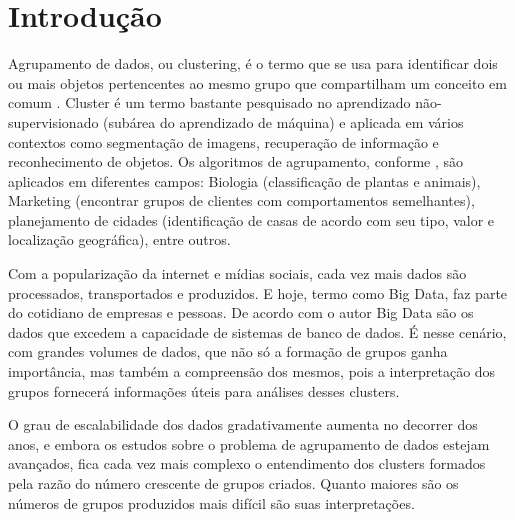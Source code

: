 

\chapter{Introdução} \label{cap:introd}

Agrupamento de dados, ou clustering, é o termo que se usa para identificar dois ou mais objetos pertencentes ao mesmo grupo que compartilham um conceito em comum \cite{Kumar2013}. Cluster é um termo bastante pesquisado no aprendizado não-supervisionado (subárea do aprendizado de máquina) e  aplicada em vários contextos como segmentação de imagens, recuperação de informação e reconhecimento de objetos. Os algoritmos de agrupamento, conforme , são aplicados em diferentes campos: Biologia (classificação de plantas e animais), Marketing (encontrar grupos de clientes com comportamentos semelhantes), planejamento de cidades (identificação de casas de acordo com seu tipo, valor e localização geográfica), entre outros.

Com a popularização da internet e mídias sociais, cada vez mais dados são processados, transportados e produzidos. E hoje, termo como Big Data, faz parte do cotidiano de empresas e pessoas. De acordo com o autor  Big Data são os dados que excedem a capacidade de sistemas de banco de dados. É nesse cenário, com grandes volumes de dados, que não só a formação de grupos ganha importância, mas também a compreensão dos mesmos, pois a interpretação dos grupos fornecerá informações úteis para análises desses clusters.


O grau de escalabilidade dos dados gradativamente aumenta no decorrer dos anos, e embora os estudos sobre o problema de agrupamento de dados estejam avançados, fica cada vez mais complexo o entendimento dos clusters formados pela razão do número crescente de grupos criados. Quanto maiores são os números de grupos produzidos mais  difícil são suas interpretações. 

